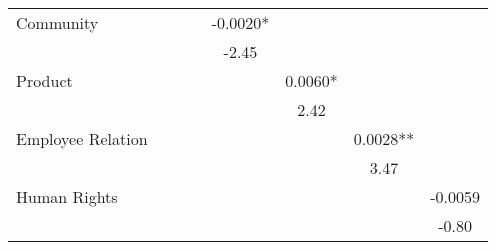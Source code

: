 \begin{landscape}
\begin{table}[H]
\begin{tabular}{lccccccc}
			Community & \cellcolor[rgb]{ .906,  .902,  .902} & \cellcolor[rgb]{ .906,  .902,  .902} & \cellcolor[rgb]{ .906,  .902,  .902} & \cellcolor[rgb]{ .906,  .902,  .902}-0.0020* & \cellcolor[rgb]{ .906,  .902,  .902} & \cellcolor[rgb]{ .906,  .902,  .902} & \cellcolor[rgb]{ .906,  .902,  .902} \\
			& \cellcolor[rgb]{ .906,  .902,  .902} & \cellcolor[rgb]{ .906,  .902,  .902} & \cellcolor[rgb]{ .906,  .902,  .902} & \cellcolor[rgb]{ .906,  .902,  .902}-2.45 & \cellcolor[rgb]{ .906,  .902,  .902} & \cellcolor[rgb]{ .906,  .902,  .902} & \cellcolor[rgb]{ .906,  .902,  .902} \\
			Product & \cellcolor[rgb]{ .906,  .902,  .902} & \cellcolor[rgb]{ .906,  .902,  .902} & \cellcolor[rgb]{ .906,  .902,  .902} & \cellcolor[rgb]{ .906,  .902,  .902} & \cellcolor[rgb]{ .906,  .902,  .902}0.0060* & \cellcolor[rgb]{ .906,  .902,  .902} & \cellcolor[rgb]{ .906,  .902,  .902} \\
			& \cellcolor[rgb]{ .906,  .902,  .902} & \cellcolor[rgb]{ .906,  .902,  .902} & \cellcolor[rgb]{ .906,  .902,  .902} & \cellcolor[rgb]{ .906,  .902,  .902} & \cellcolor[rgb]{ .906,  .902,  .902}2.42 & \cellcolor[rgb]{ .906,  .902,  .902} & \cellcolor[rgb]{ .906,  .902,  .902} \\
			Employee Relation & \cellcolor[rgb]{ .906,  .902,  .902} & \cellcolor[rgb]{ .906,  .902,  .902} & \cellcolor[rgb]{ .906,  .902,  .902} & \cellcolor[rgb]{ .906,  .902,  .902} & \cellcolor[rgb]{ .906,  .902,  .902} & \cellcolor[rgb]{ .906,  .902,  .902}0.0028** & \cellcolor[rgb]{ .906,  .902,  .902} \\
			& \cellcolor[rgb]{ .906,  .902,  .902} & \cellcolor[rgb]{ .906,  .902,  .902} & \cellcolor[rgb]{ .906,  .902,  .902} & \cellcolor[rgb]{ .906,  .902,  .902} & \cellcolor[rgb]{ .906,  .902,  .902} & \cellcolor[rgb]{ .906,  .902,  .902}3.47 & \cellcolor[rgb]{ .906,  .902,  .902} \\
			Human Rights & \cellcolor[rgb]{ .906,  .902,  .902} & \cellcolor[rgb]{ .906,  .902,  .902} & \cellcolor[rgb]{ .906,  .902,  .902} & \cellcolor[rgb]{ .906,  .902,  .902} & \cellcolor[rgb]{ .906,  .902,  .902} & \cellcolor[rgb]{ .906,  .902,  .902} & \cellcolor[rgb]{ .906,  .902,  .902}-0.0059 \\
			& \cellcolor[rgb]{ .906,  .902,  .902} & \cellcolor[rgb]{ .906,  .902,  .902} & \cellcolor[rgb]{ .906,  .902,  .902} & \cellcolor[rgb]{ .906,  .902,  .902} & \cellcolor[rgb]{ .906,  .902,  .902} & \cellcolor[rgb]{ .906,  .902,  .902} & \cellcolor[rgb]{ .906,  .902,  .902}-0.80 \\

\end{tabular}
\end{table}
\end{landscape}
